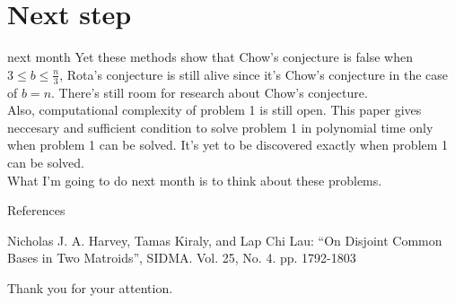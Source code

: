 \documentclass[11pt,xcolor=dvipsnames,table,dvipdfmx]{beamer}
\begin{document}
\section{Next step}
\begin{frame}{next month}
 Yet these methods show that Chow's conjecture is false when $3 \leq b \leq \frac{n}{3}$, Rota's conjecture is still alive since it's Chow's conjecture in the case of $b = n$. There's still room for research about Chow's conjecture. \\
 Also, computational complexity of problem 1 is still open. This paper gives neccesary and sufficient condition to solve problem 1 in polynomial time only when problem 1 can be solved. It's yet to be discovered exactly when problem 1 can be solved. \\
 What I'm going to do next month is to think about these problems.
\end{frame}

\begin{frame}{References}
 \begin{thebibliography}{9}
	 \small{Nicholas J. A. Harvey, Tamas Kiraly, and Lap Chi Lau: ``On Disjoint Common Bases in Two Matroids'', SIDMA. Vol. 25, No. 4. pp. 1792-1803}
 \end{thebibliography}
\end{frame}

\begin{frame}
 \begin{center}
  Thank you for your attention.
 \end{center}
\end{frame}
\end{document}
